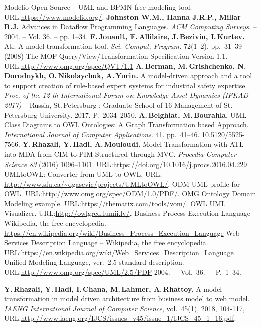 \documentclass[runningheads]{llncs}
\begin{document}
\begin{thebibliography}{11}
 Modelio Open Source -- UML and BPMN free modeling tool. URL:\url{https://www.modelio.org/}.
 \textbf{Johnston W.M., Hanna J.R.P., Millar R.J.} Advances in Dataflow Programming Languages.
  \emph{ACM Computing Surveys}. -- 2004. -- Vol. 36. -- pp. 1--34.
 \textbf{F.\,Jouault, F.\,Allilaire, J.\,Bezivin, I.\,Kurtev.} Atl: A model transformation tool. \emph{Sci. Comput. Program.} 72(1--2), pp.~31--39 (2008)
 The MOF Query/View/Transformation Specification Version 1.1. URL:\url{http://www.omg.org/spec/QVT/1.1}
 \textbf{A.\,Berman, M.\,Grishchenko, N.\,Dorodnykh, O.\,Nikolaychuk, A.\,Yurin.} A model-driven approach and a tool to support creation of rule-based expert systems for industrial safety expertise. \emph{Proc. of the 12 th International Forum on Knowledge Asset Dynamics (IFKAD-2017)} -- Russia, St.\,Petersburg : Graduate School of 16 Management of St.\,Petersburg University.  2017.  P.~2034--2050.
 \textbf{A.\,Belghiat, M.\,Bourahla.} UML Class Diagrams to OWL Ontologies: A Graph Transformation based Approach. \emph{International Journal of Computer Applications}. 41. pp.~41--46. 10.5120/5525-7566.
\textbf{Y.\,Rhazali, Y.\,Hadi, A.\,Mouloudi.} Model Transformation with ATL into MDA from CIM to PIM Structured through MVC. \emph{Procedia Computer Science 83} (2016) 1096–1101. URL:\url{https://doi.org/10.1016/j.procs.2016.04.229}
 UMLtoOWL: Converter from UML to OWL. URL: \url{http://www.sfu.ca/~dgasevic/projects/UMLtoOWL/}.
 ODM UML profile for OWL. URL:\url{http://www.omg.org/spec/ODM/1.0/PDF/}.
 OMG Ontology Domain Modeling example. URL:\url{https://thematix.com/tools/vom/}.
 OWL UML Visualizer. URL:\url{http://owlgred.lumii.lv/}.
 Business Process Execution Language -- Wikipedia, the free encyclopedia. \url{https://en.wikipedia.org/wiki/Business_Process_Execution_Language}
 Web Services Description Language -- Wikipedia, the free encyclopedia.  URL:\url{https://en.wikipedia.org/wiki/Web_Services_Description_Language}
 Unified Modeling Language, ver.~2.5 standard description. URL:\url{http://www.omg.org/spec/UML/2.5/PDF}
  2004.~--~Vol.~36.~--~P.~1--34.

\textbf{Y.\,Rhazali, Y.\,Hadi, I.\,Chana, M.\,Lahmer, A.\,Rhattoy.} A model
transformation in model driven architecture from business model to web
model. \emph{IAENG International Journal of Computer Science}, vol.~45(1), 2018, 104-117, URL:\url{http://www.iaeng.org/IJCS/issues_v45/issue_1/IJCS_45_1_16.pdf}.


\end{thebibliography}
\end{document}
